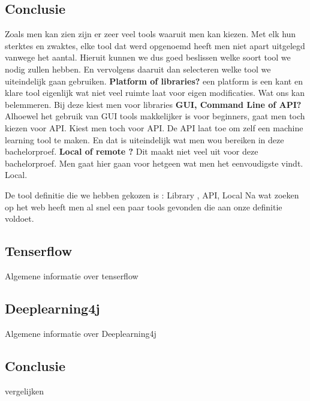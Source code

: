 \subsection{Conclusie}
Zoals men kan zien zijn er zeer veel tools waaruit men kan kiezen. Met elk hun sterktes en zwaktes, elke tool dat werd opgenoemd heeft men niet apart uitgelegd vanwege het aantal. Hieruit kunnen we dus goed beslissen welke soort tool we nodig zullen hebben. En vervolgens daaruit dan selecteren welke tool we uiteindelijk gaan gebruiken.\newline\newline
\textbf{Platform of libraries?}\newline
een platform is een kant en klare tool eigenlijk wat niet veel ruimte laat voor eigen modificaties. Wat ons kan belemmeren. Bij deze kiest men voor  libraries\newline
\textbf{GUI, Command Line of API?}\newline
Alhoewel het gebruik van GUI tools makkelijker is voor beginners, gaat men toch kiezen voor API. Kiest men toch voor API. De API laat toe om zelf een machine learning tool te maken. En dat is uiteindelijk wat men wou bereiken in deze bachelorproef.
\textbf{Local of remote ?} \newline
Dit maakt niet veel uit voor deze bachelorproef. Men gaat hier gaan voor hetgeen wat men het eenvoudigste vindt. Local.

De tool definitie die we hebben gekozen is : Library , API, Local
Na wat zoeken op het web heeft men al snel een paar tools gevonden die aan onze definitie voldoet.

\subsection{Tenserflow}
Algemene informatie over tenserflow

\subsection{Deeplearning4j} 
Algemene informatie over Deeplearning4j

\subsection{Conclusie}
vergelijken

